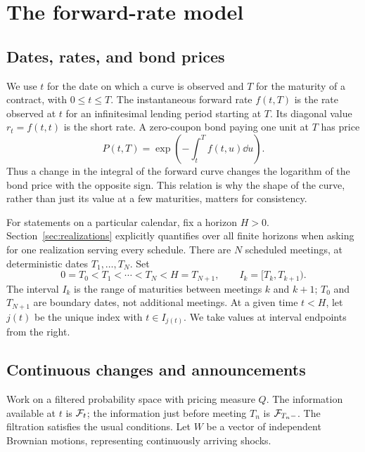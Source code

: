 \section{The forward-rate model}\label{sec:setting}
\subsection{Dates, rates, and bond prices}
We use $t$ for the date on which a curve is observed and $T$ for the maturity of a contract, with $0\le t\le T$. The instantaneous forward rate $f(t,T)$ is the rate observed at $t$ for an infinitesimal lending period starting at $T$. Its diagonal value $r_t=f(t,t)$ is the short rate. A zero-coupon bond paying one unit at $T$ has price
\begin{equation}
P(t,T)=\exp\left(-\int_t^T f(t,u)\dd u\right).
\label{eq:bonddefinition}
\end{equation}
Thus a change in the integral of the forward curve changes the logarithm of the bond price with the opposite sign. This relation is why the shape of the curve, rather than just its value at a few maturities, matters for consistency.

For statements on a particular calendar, fix a horizon $H>0$. Section~\ref{sec:realizations} explicitly quantifies over all finite horizons when asking for one realization serving every schedule. There are $N$ scheduled meetings, at deterministic dates $T_1,\ldots,T_N$. Set
\[
0=T_0<T_1<\cdots<T_N<H=T_{N+1},\qquad I_k=[T_k,T_{k+1}).
\]
The interval $I_k$ is the range of maturities between meetings $k$ and $k+1$; $T_0$ and $T_{N+1}$ are boundary dates, not additional meetings. At a given time $t<H$, let $j(t)$ be the unique index with $t\in I_{j(t)}$. We take values at interval endpoints from the right.

\subsection{Continuous changes and announcements}
Work on a filtered probability space with pricing measure $Q$. The information available at $t$ is $\mathcal F_t$; the information just before meeting $T_n$ is $\mathcal F_{T_n-}$. The filtration satisfies the usual conditions. Let $W$ be a vector of independent Brownian motions, representing continuously arriving shocks.

